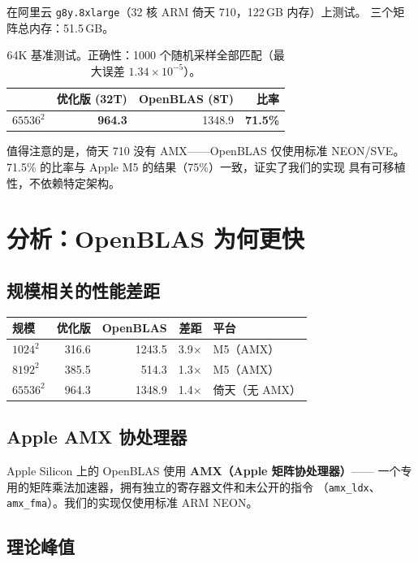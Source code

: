 \documentclass[11pt,a4paper]{article}
\begin{document}
在阿里云 \texttt{g8y.8xlarge}（32 核 ARM 倚天 710，122\,GB 内存）上测试。
三个矩阵总内存：51.5\,GB。

\begin{table}[H]\centering
\begin{tabular}{l|rr|r}
\toprule & 优化版 (32T) & OpenBLAS (8T) & 比率 \\
\midrule $65536^2$ & \textbf{964.3} & 1348.9 & \textbf{71.5\%} \\
\bottomrule
\end{tabular}
\caption{64K 基准测试。正确性：1000 个随机采样全部匹配（最大误差 $1.34\times10^{-5}$）。}
\end{table}

值得注意的是，倚天 710 没有 AMX——OpenBLAS 仅使用标准 NEON/SVE。
71.5\% 的比率与 Apple M5 的结果（75\%）一致，证实了我们的实现
具有可移植性，不依赖特定架构。

\section{分析：OpenBLAS 为何更快}

\subsection{规模相关的性能差距}

\begin{center}
\begin{tabular}{l|rr|r|l}
\toprule 规模 & 优化版 & OpenBLAS & 差距 & 平台 \\
\midrule $1024^2$ & 316.6 & 1243.5 & 3.9$\times$ & M5（AMX） \\
$8192^2$ & 385.5 & 514.3 & 1.3$\times$ & M5（AMX） \\
$65536^2$ & 964.3 & 1348.9 & 1.4$\times$ & 倚天（无 AMX） \\
\bottomrule
\end{tabular}
\end{center}

\subsection{Apple AMX 协处理器}

Apple Silicon 上的 OpenBLAS 使用 \textbf{AMX（Apple 矩阵协处理器）}——
一个专用的矩阵乘法加速器，拥有独立的寄存器文件和未公开的指令
（\texttt{amx\_ldx}、\texttt{amx\_fma}）。我们的实现仅使用标准 ARM NEON。

\subsection{理论峰值}
\end{document}
